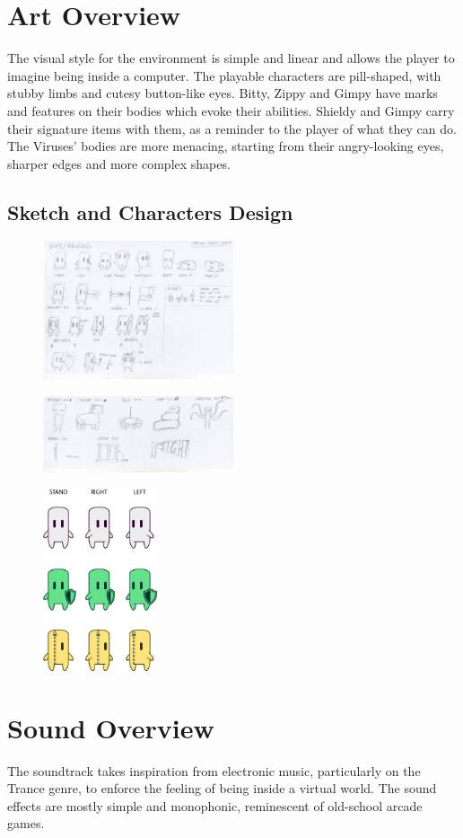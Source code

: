\documentclass[12pt, a4paper]{report}
\begin{document}
\chapter{Art Overview}
The visual style for the environment is simple and linear and allows the player to imagine being inside a computer.
The playable characters are pill-shaped, with stubby limbs and cutesy button-like eyes. Bitty, Zippy and Gimpy have marks and features on their bodies which evoke their abilities. Shieldy and Gimpy carry their signature items with them, as a reminder to the player of what they can do.\\
The Viruses' bodies are more menacing, starting from their angry-looking eyes, sharper edges and more complex shapes.\\

\section*{Sketch and Characters Design}
\begin{figure}[H]
	\centering
	\includegraphics[width=0.5\textwidth]{images/Characters}
\end{figure}
	\begin{figure}[H]
	\centering
	\includegraphics[width=0.5\textwidth]{images/Enemy}
\end{figure}
	\begin{figure}[H]
	\centering
	\includegraphics[width=0.3\textwidth]{images/Bits}
\end{figure}


\chapter{Sound Overview}
The soundtrack takes inspiration from electronic music, particularly on the Trance genre, to enforce the feeling of being inside a virtual world.
The sound effects are mostly simple and monophonic, reminescent of old-school arcade games.\\
\end{document}
